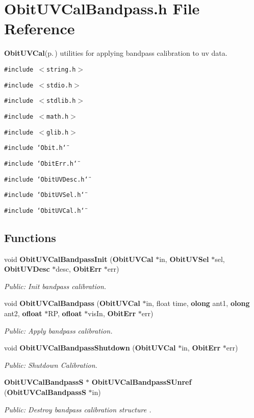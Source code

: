 \section{Obit\-UVCal\-Bandpass.h File Reference}
\label{ObitUVCalBandpass_8h}
{\bf Obit\-UVCal}{\rm (p.\,\pageref{structObitUVCal})} utilities for applying bandpass calibration to uv data. 

{\tt \#include $<$string.h$>$}\par
{\tt \#include $<$stdio.h$>$}\par
{\tt \#include $<$stdlib.h$>$}\par
{\tt \#include $<$math.h$>$}\par
{\tt \#include $<$glib.h$>$}\par
{\tt \#include \char`\"{}Obit.h\char`\"{}}\par
{\tt \#include \char`\"{}Obit\-Err.h\char`\"{}}\par
{\tt \#include \char`\"{}Obit\-UVDesc.h\char`\"{}}\par
{\tt \#include \char`\"{}Obit\-UVSel.h\char`\"{}}\par
{\tt \#include \char`\"{}Obit\-UVCal.h\char`\"{}}\par
\subsection*{Functions}
\begin{CompactItemize}
\item 
void {\bf Obit\-UVCal\-Bandpass\-Init} ({\bf Obit\-UVCal} $\ast$in, {\bf Obit\-UVSel} $\ast$sel, {\bf Obit\-UVDesc} $\ast$desc, {\bf Obit\-Err} $\ast$err)
\begin{CompactList}\small\item\em Public: Init bandpass calibration. \item\end{CompactList}\item 
void {\bf Obit\-UVCal\-Bandpass} ({\bf Obit\-UVCal} $\ast$in, float time, {\bf olong} ant1, {\bf olong} ant2, {\bf ofloat} $\ast$RP, {\bf ofloat} $\ast$vis\-In, {\bf Obit\-Err} $\ast$err)
\begin{CompactList}\small\item\em Public: Apply bandpass calibration. \item\end{CompactList}\item 
void {\bf Obit\-UVCal\-Bandpass\-Shutdown} ({\bf Obit\-UVCal} $\ast$in, {\bf Obit\-Err} $\ast$err)
\begin{CompactList}\small\item\em Public: Shutdown Calibration. \item\end{CompactList}\item 
{\bf Obit\-UVCal\-Bandpass\-S} $\ast$ {\bf Obit\-UVCal\-Bandpass\-SUnref} ({\bf Obit\-UVCal\-Bandpass\-S} $\ast$in)
\begin{CompactList}\small\item\em Public: Destroy bandpass calibration structure . \item\end{CompactList}\end{CompactItemize}


